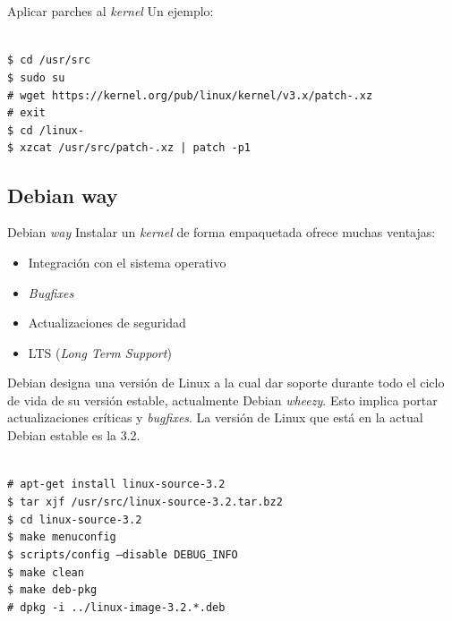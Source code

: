 \begin{frame}{Aplicar parches al \textit{kernel}}
  Un ejemplo:
  { \tiny
  \begin{block}{}
    \texttt{\\
\$ cd /usr/src \\
\$ sudo su \\
\# wget
https://kernel.org/pub/linux/kernel/v3.x/patch-\PATCHEDKERNELVERSION.xz \\
\# exit \\
\$ cd \KERNELSOURCEPATH/linux-\KERNELBASEVERSION \\
\$ xzcat /usr/src/patch-\PATCHEDKERNELVERSION.xz | patch -p1}
\end{block}
}
\end{frame}

\subsection{Debian way}
\begin{frame}{Debian \textit{way}}
Instalar un \textit{kernel} de forma empaquetada ofrece muchas ventajas:
\begin{itemize}
\item Integración con el sistema operativo
\item \textit{Bugfixes}
\item Actualizaciones de \alert{seguridad}
\item LTS (\textit{Long Term Support})
\end{itemize}

\vfill Debian designa una versión de Linux a la cual dar soporte durante
todo el ciclo de vida de su versión estable, actualmente Debian
\textit{wheezy}. Esto implica portar actualizaciones críticas y
\textit{bugfixes}. La versión de Linux que está en la actual Debian estable
es la 3.2.

{ \tiny
  \begin{block}{}
    \texttt{\\
\# apt-get install linux-source-3.2 \\
\$ tar xjf /usr/src/linux-source-3.2.tar.bz2 \\
\$ cd linux-source-3.2 \\
\$ make menuconfig \\
\$ scripts/config --disable DEBUG\_INFO \\
\$ make clean \\
\$ make deb-pkg \\
\# dpkg -i ../linux-image-3.2.*.deb
}
\end{block} }

\end{frame}

